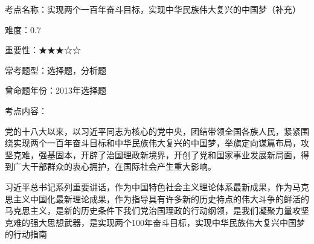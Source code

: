 考点名称：实现两个一百年奋斗目标，实现中华民族伟大复兴的中国梦（补充）

难度：0.7

重要性：★★★☆☆

常考题型：选择题，分析题

曾命题年份：2013年选择题

考点内容：

党的十八大以来，以习近平同志为核心的党中央，团结带领全国各族人民，紧紧围绕实现两个一百年奋斗目标和中华民族伟大复兴的中国梦，举旗定向谋篇布局，攻坚克难，强基固本，开辟了治国理政新境界，开创了党和国家事业发展新局面，得到广大干部群众的衷心拥护，在国际社会产生重大影响。

习近平总书记系列重要讲话，作为中国特色社会主义理论体系最新成果，作为马克思主义中国化最新理论成果，作为指导具有许多新的历史特点的伟大斗争的鲜活的马克思主义，是新的历史条件下我们党治国理政的行动纲领，是我们凝聚力量攻坚克难的强大思想武器，是实现两个100年奋斗目标，实现中华民族伟大复兴中国梦的行动指南
